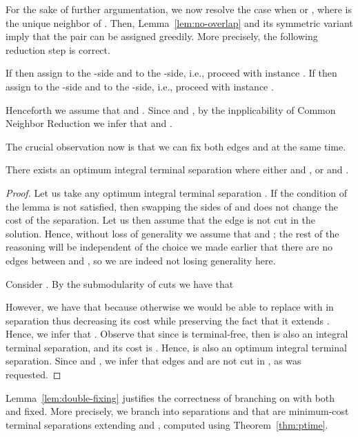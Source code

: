 For the sake of further argumentation, we now resolve the case when  or , where  is the unique neighbor of . Then, Lemma~\ref{lem:no-overlap} and its symmetric variant imply that the pair  can be assigned greedily. More precisely, the following reduction step is correct.

\begin{reductionstep}\label{red:(1,1)b-corner}
If  then assign  to the -side and  to the -side, i.e., proceed with instance . If  then assign  to the -side and  to the -side, i.e., proceed with instance .
\end{reductionstep}








Henceforth we assume that  and . Since  and , by the inpplicability of Common Neighbor Reduction we infer that  and .

The crucial observation now is that we can fix both edges  and  at the same time.

\begin{lemma}\label{lem:double-fixing}
There exists an optimum integral terminal separation  where either  and , or  and .
\end{lemma}
\begin{proof}
Let us take any optimum integral terminal separation . If the condition of the lemma is not satisfied, then swapping the sides of  and  does not change the cost of the separation. Let us then assume that the edge  is not cut in the solution. Hence, without loss of generality we assume that  and ; the rest of the reasoning will be independent of the choice we made earlier that there are no edges between  and , so we are indeed not losing generality here.

Consider . By the submodularity of cuts we have that

However, we have that  because otherwise we would be able to replace  with  in separation  thus decreasing its cost while preserving the fact that it extends . Hence, we infer that . Observe that since  is terminal-free, then  is also an integral terminal separation, and its cost is . Hence,  is also an optimum integral terminal separation. Since  and , we infer that edges  and  are not cut in , as was requested.
\end{proof}

Lemma~\ref{lem:double-fixing} justifies the correctness of branching on  with both  and  fixed. More precisely, we branch into separations  and  that are minimum-cost terminal separations extending  and , computed using Theorem~\ref{thm:ptime}. 

